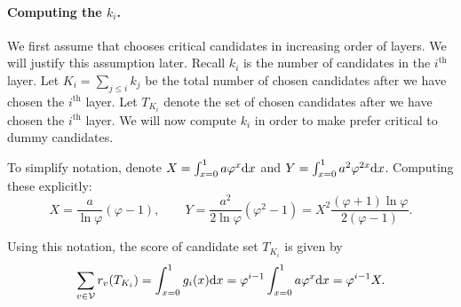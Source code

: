 


\paragraph{Computing the $k_i$.} We first assume that \g{} chooses critical candidates in increasing order of layers. We will justify this assumption later. Recall $k_i$ is the number of candidates in the $i^{\text{th}}$ layer. Let $K_i = \sum_{j \le i} k_j$ be the total number of chosen candidates after we have chosen the $i^{\text{th}}$ layer. Let $T_{K_i}$ denote the set of chosen candidates after we have chosen the $i^{\text{th}}$ layer. We will now compute $k_i$ in order to make \g{} prefer critical to dummy candidates.


To simplify notation, denote $X = \int_{x = 0}^1 a\varphi^x\mathrm{d} x$ and $Y = \int_{x = 0}^1 a^2\varphi^{2x}\mathrm{d} x$. Computing these explicitly:
$$X = \frac{a}{\ln\varphi}(\varphi - 1), \qquad Y = \frac{a^2}{2\ln\varphi}(\varphi^2 - 1) = X^2 \frac{(\varphi + 1)\ln\varphi}{2(\varphi - 1)}.$$

Using this notation, the score of candidate set $T_{K_i}$ is given by
\begin{equation}
    \label{eq:improve}
    \sum_{v \in \mathcal{V}}r_v(T_{K_i})= \int_{x = 0}^1 g_i(x) \mathrm{d} x = \varphi^{i - 1}\int_{x = 0}^1 a\varphi^x\mathrm{d} x = \varphi^{i - 1} X.
    \end{equation}

